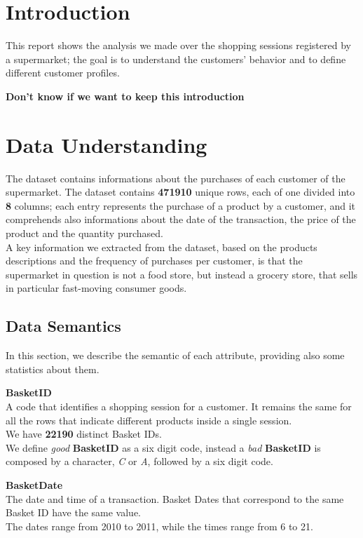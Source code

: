 \section{Introduction}

This report shows the analysis we made over the shopping sessions registered by a supermarket; the goal is to understand the customers' behavior and to define different customer profiles.

\textbf{Don't know if we want to keep this introduction}
\pagebreak

\section{Data Understanding}

The dataset contains informations about the purchases of each customer of the supermarket. The dataset contains \textbf{471910} unique rows, each of one divided into \textbf{8} columns; each entry represents the purchase of a product by a customer, and it comprehends also informations about the date of the transaction, the price of the product and the quantity purchased.\\
A key information we extracted from the dataset, based on the products descriptions and the frequency of purchases per customer, is that the supermarket in question is not a food store, but instead a grocery store, that sells in particular fast-moving consumer goods.

\subsection{Data Semantics}

In this section, we describe the semantic of each attribute, providing also some statistics about them.

\textbf{BasketID} \\
A code that identifies a shopping session for a customer. It remains the same for all the rows that indicate different products inside a single session.\\
We have \textbf{22190} distinct Basket IDs.\\
We define \emph{good} \textbf{BasketID} as a six digit code, instead a \emph{bad} \textbf{BasketID} is composed by a character, \emph{C} or \emph{A}, followed by a six digit code.

\textbf{BasketDate}\\
The date and time of a transaction. Basket Dates that correspond to the same Basket ID have the same value.\\
The dates range from 2010 to 2011, while the times range from 6 to 21.

